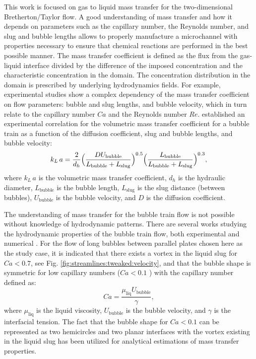 \documentclass[preprint,12pt]{elsarticle}
\newcommand{\beq}{\begin{equation}}
\newcommand{\feq}{\end{equation}}
\newcommand{\vol}{k_L\,a}
\newcommand{\lbubble}{L_{\mathrm{bubble}}}
\newcommand{\lslug}{L_{\mathrm{slug}}}
\newcommand{\ububble}{U_{\mathrm{bubble}}}
\begin{document}
This work is focused on  gas to liquid mass transfer  for the two-dimensional Bretherton/Taylor flow. A good understanding of mass transfer and how it depends on 
parameters such as the capillary number, the Reynolds number, and slug and bubble lengths allows to properly
manufacture a microchannel with properties necessary to ensure that chemical
reactions are performed in the best possible manner. The mass transfer coefficient is defined as the flux from the 
gas-liquid interface divided by the difference of the imposed concentration and the characteristic concentration in the domain.
 The  concentration distribution in the domain is prescribed by underlying hydrodynamics fields. 
 For example, experimental studies \cite{yue-mass,bercic-mass} show a complex dependency of the mass transfer coefficient on flow parameters:
 bubble and slug lengths, and bubble velocity, which  in turn relate to the capillary number $Ca$ and the Reynolds number $Re$. 
\citet{yue-mass} established an experimental correlation for the volumetric mass transfer coefficient for a bubble train as
a function of the diffusion coefficient, slug and bubble lengths, and bubble velocity: 
\begin{equation}
\vol =\frac{2}{d_h} \Bigl(\frac{D
\ububble}{\lbubble+\lslug}\Bigr)^{0.5}
\Bigl(\frac{\lbubble}{\lbubble+\lslug}\Bigr)^{0.3},
\end{equation}
where $\vol$ is the volumetric mass transfer coefficient, $d_h$ is the hydraulic
diameter, $\lbubble$ is the bubble length, $\lslug$ is the slug distance (between bubbles),
$\ububble$ is the bubble velocity, and $D$ is the diffusion coefficient. 

The understanding of mass transfer for the bubble train flow is not possible without knowledge of hydrodynamic patterns.
There are several works studying the hydrodynamic properties of the bubble train flow, both
experimental \cite{kreutzer-pressure-drop,cerro-space,cerro-bubble-train} and numerical \cite{wang-non-circular,kuzmin-binary3d,giavedoni-numerical,heil-threedim}.
 For the flow of long bubbles between parallel plates chosen here as the study case, it is indicated that  there exists a vortex 
in the liquid slug for $Ca<0.7$, see Fig. \ref{fig:streamlines:tweaked:velocity}, and that the bubble shape is symmetric for low capillary 
numbers ($Ca<0.1$ \cite{cerro-bubble-train}) with the capillary number defined as:
 \beq
 Ca=\frac{\mu_{\mathrm{liq}} \ububble}{\gamma},
 \feq
 where $\mu_{\mathrm{liq}}$ is the liquid viscosity, $\ububble$ is the bubble velocity, and $\gamma$ is the interfacial tension.
 The fact that the bubble shape for $Ca<0.1$ can be represented as two hemicircles and two planar interfaces with the vortex existing in the liquid slug has been 
utilized for analytical estimations of mass transfer properties.
\end{document}
